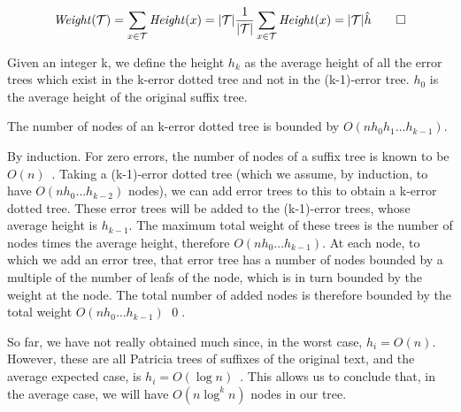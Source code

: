 \[ \mathit{Weight}(\mathcal{T}) = \sum_{x \in \mathcal{T}}\mathit{Height}(x) = |\mathcal{T}|\frac{1}{|\mathcal{T}|}\sum_{x \in \mathcal{T}}\mathit{Height}(x) = |\mathcal{T}|\hat{h} \qed \]

\begin{definition}
Given an integer k, we define the height $h_k$ as the average height of all the error trees which exist in the k-error dotted tree and not in the (k-1)-error tree. $h_0$ is the average height of the original suffix tree.
\end{definition}

\begin{lemma}
The number of nodes of an k-error dotted tree is bounded by $O(nh_0h_1\dots{}h_{k-1})$.
\end{lemma}

\Proof
By induction. For zero errors, the number of nodes of a suffix tree is known to be $O(n)$~\cite{}. Taking a (k-1)-error dotted tree (which we assume, by induction, to have $O(nh_0\dots{}h_{k-2})$ nodes), we can add error trees to this to obtain a k-error dotted tree. These error trees will be added to the (k-1)-error trees, whose average height is $h_{k-1}$. The maximum total weight of these trees is the number of nodes times the average height, therefore $O(nh_0\dots{}h_{k-1})$. At each node, to which we add an error tree, that error tree has a number of nodes bounded by a multiple of the number of leafs of the node, which is in turn bounded by the weight at the node. The total number of added nodes is therefore bounded by the total weight $O(nh_0\dots{}h_{k-1})$ \qed.

So far, we have not really obtained much since, in the worst case, $h_i=O(n)$. However, these are all Patricia trees of suffixes of the original text, and the average expected case, is $h_i=O(\log n)$~\cite{}. This allows us to conclude that, in the average case, we will have $O(n\log^k n)$ nodes in our tree.

